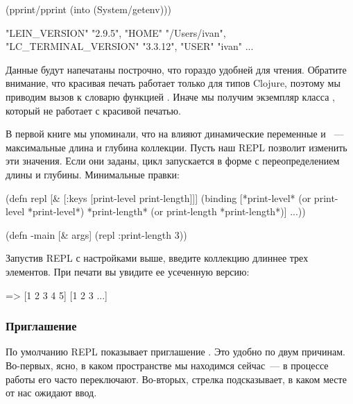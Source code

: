 \begin{english}
  \begin{clojure}
(pprint/pprint
  (into {} (System/getenv)))

{"LEIN_VERSION" "2.9.5",
 "HOME" "/Users/ivan",
 "LC_TERMINAL_VERSION" "3.3.12",
 "USER" "ivan"
 ...
 }
  \end{clojure}
\end{english}

Данные будут напечатаны построчно, что гораздо удобней для чтения. Обратите внимание, что красивая печать работает только для типов Clojure, поэтому мы приводим вызов  к словарю функцией . Иначе мы получим экземпляр класса , который не работает с красивой печатью.

В первой книге мы упоминали, что на  влияют динамические переменные  и ~--- максимальные длина и глубина коллекции. Пусть наш REPL позволит изменить эти значения. Если они заданы, цикл запускается в форме  с переопределением длины и глубины. Минимальные правки:

\begin{english}
  \begin{clojure}
(defn repl [& [{:keys [print-level
                       print-length]}]]
  (binding [*print-level*
            (or print-level *print-level*)
            *print-length*
            (or print-length *print-length*)]
    ...))

(defn -main [& args]
  (repl {:print-length 3}))
  \end{clojure}
\end{english}

Запустив REPL с настройками выше, введите коллекцию длиннее трех элементов. При печати вы увидите ее усеченную версию:

\begin{english}
  \begin{clojure}
=> [1 2 3 4 5]
[1 2 3 ...]
  \end{clojure}
\end{english}

\subsubsection{Приглашение}

По умолчанию REPL показывает приглашение . Это удобно по двум причинам. Во-первых, ясно, в каком пространстве мы находимся сейчас~--- в процессе работы его часто переключают. Во-вторых, стрелка подсказывает, в каком месте от нас ожидают ввод.

